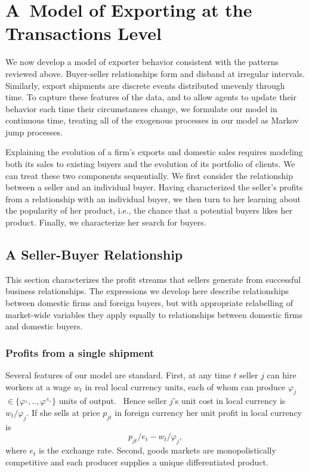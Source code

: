 \section{A\ Model of Exporting at the Transactions Level}

We now develop a model of exporter behavior consistent with the patterns
reviewed above. Buyer-seller relationships form and disband at irregular
intervals. Similarly, export shipments are discrete events distributed
unevenly through time. To capture these features of the data, and to allow
agents to update their behavior each time their circumstances change, we
formulate our model in continuous time, treating all of the exogenous
processes in our model as Markov jump processes.

Explaining the evolution of a firm's exports and domestic sales requires
modeling both its sales to existing buyers and the evolution of its
portfolio of clients. We can treat these two components sequentially. We
first consider the relationship between a seller and an individual buyer.
Having characterized the seller's profits from a relationship with an
individual buyer, we then turn to her learning about the popularity of her
product, i.e., the chance that a potential buyers likes her product.
Finally, we characterize her search for buyers.





\subsection{A Seller-Buyer Relationship}

This section characterizes the profit streams that sellers generate from
successful business relationships. The expressions we develop here describe
relationships between domestic firms and foreign buyers, but with
appropriate relabelling of market-wide variables they apply equally to
relationships between domestic firms and domestic buyers.

\subsubsection{Profits from a single shipment}

Several features of our model are standard. First, at any time $t$ seller $j$
can hire workers at a wage $w_{t}$ in real local currency units, each of
whom can produce $\varphi _{j}$ $\in \{\varphi ^{_{1}},..,\varphi
^{_{N_{\varphi }}}\}$ units of output.\footnotemark{} \ Hence seller $j$'s unit cost in local currency is $%
w_{t}/\varphi _{j}.$ If she sells at price $p_{jt}$ in foreign currency her
unit profit in local currency is%
\begin{equation}
p_{jt}/e_{t}-w_{t}/\varphi _{j},  \label{unit profit}
\end{equation}%
where $e_{t}$ is the exchange rate. Second, goods markets are
monopolistically competitive and each producer supplies a unique
differentiated product.

